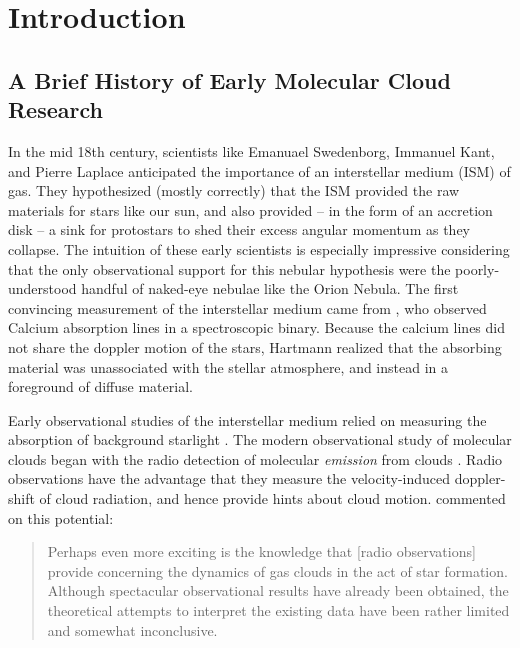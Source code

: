\chapter{Introduction}

\section{A Brief History of Early Molecular Cloud Research}

In the mid 18th century, scientists like Emanuael Swedenborg, Immanuel Kant, and Pierre Laplace anticipated the importance of an interstellar medium (ISM) of gas. They hypothesized (mostly correctly) that the ISM provided the raw materials for stars like our sun, and also provided -- in the form of an accretion disk -- a sink for protostars to shed their excess angular momentum as they collapse. The intuition of these early scientists is especially impressive considering that the only observational support for this nebular hypothesis were the poorly-understood handful of naked-eye nebulae like the Orion Nebula. The first convincing measurement of the interstellar medium came from \cite{Hartmann04}, who observed Calcium absorption lines in a spectroscopic binary. Because the calcium lines did not share the doppler motion of the stars, Hartmann realized that the absorbing material was unassociated with the stellar atmosphere, and instead in a foreground of diffuse material. 

Early observational studies of the interstellar medium relied on measuring the absorption of background starlight \citep{Barnard19, Bates51}. The modern observational study of molecular clouds began with the radio detection of molecular \textit{emission} from clouds \citep{Gundermann65, Palmer67, Wilson70}. Radio observations have the advantage that they measure the velocity-induced doppler-shift of cloud radiation, and hence provide hints about cloud motion. \cite{Goldreich74} commented on this potential:

\blockquote{Perhaps even more exciting is the knowledge that [radio observations] provide concerning the dynamics of gas clouds in the act of star formation. Although spectacular observational results have already been obtained, the theoretical attempts to interpret the existing data have been rather limited and somewhat inconclusive.}

